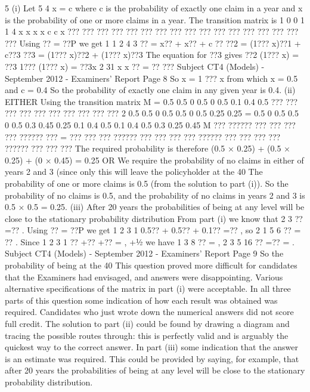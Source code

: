 \documentclass[a4paper,12pt]{article}
\begin{document}
5
(i) Let 5
4
x = c
where c is the probability of exactly one claim in a year and x is the probability of one
or more claims in a year.
The transition matrix is
1 0
0 1
1
4
x x
x x
c c x
??? ???
??? ??? ???
??? ???
??? ??? ???
??? ???
??? ??? ???
??? ???
Using ?? = ??P we get
1 1 2 4 3
?? = x?? + x?? + c ??
??2 = (1??? x)??1 + c??3
??3 = (1??? x)??2 + (1??? x)??3
The equation for ??3 gives
??2 (1??? x) = ??3 {1??? (1??? x)} = ??3x
2 31
x
x
?? = ??
???
Subject CT4 (Models) - September 2012 - Examiners' Report
Page 8
So x = 1 ??? x from which x = 0.5 and c = 0.4
So the probability of exactly one claim in any given year is 0.4.
(ii) EITHER
Using the transition matrix
M =
0.5 0.5 0
0.5 0 0.5
0.1 0.4 0.5
??? ???
??? ???
??? ???
??? ???
??? ???
2
0.5 0.5 0 0.5 0.5 0 0.5 0.25 0.25
= 0.5 0 0.5 0.5 0 0.5 0.3 0.45 0.25
0.1 0.4 0.5 0.1 0.4 0.5 0.3 0.25 0.45
M
??? ?????? ??? ??? ???
??? ?????? ??? = ??? ??? ??? ?????? ??? ??? ???
??? ?????? ??? ??? ???
??? ?????? ??? ??? ???
The required probability is therefore
(0.5 × 0.25) + (0.5 × 0.25) + (0 × 0.45) = 0.25
OR
We require the probability of no claims in either of years 2 and 3 (since only this will
leave the policyholder at the 40%
The probability of one or more claims is 0.5 (from the solution to part (i)).
So the probability of no claims is 0.5, and the probability of no claims in years 2 and 3
is 0.5 × 0.5 = 0.25.
(iii) After 20 years the probabilities of being at any level will be close to the
stationary probability distribution
From part (i) we know that 2 3 ?? =?? .
Using ?? = ??P we get
1 2 3 1 0.5?? + 0.5?? + 0.1?? =?? ,
so 2 1
5
6
?? = ?? .
Since 1 2 3 1 ?? +?? +?? = , +½
we have 1
3
8
?? = , 2 3
5
16
?? =?? = .
Subject CT4 (Models) - September 2012 - Examiners' Report
Page 9
So the probability of being at the 40%
This question proved more difficult for candidates that the Examiners had envisaged, and
answers were disappointing. Various alternative specifications of the matrix in part (i) were
acceptable. In all three parts of this question some indication of how each result was
obtained was required. Candidates who just wrote down the numerical answers did not
score full credit. The solution to part (ii) could be found by drawing a diagram and tracing
the possible routes through: this is perfectly valid and is arguably the quickest way to the
correct answer. In part (iii) some indication that the answer is an estimate was required.
This could be provided by saying, for example, that after 20 years the probabilities of being
at any level will be close to the stationary probability distribution.
\end{document}
